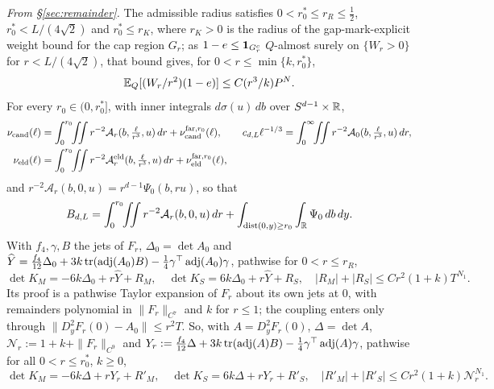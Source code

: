 \emph{From \S\ref{sec:remainder}.} The admissible radius satisfies $0<r_0^*\le r_R\le\frac12$, $r_0^*<L/(4\sqrt2)$ and $r_0^*\le r_K$, where $r_K>0$ is the radius of the gap-mark-explicit weight bound for the cap region $G_r$; as $1-e\le\mathbf 1_{G_r^c}$ $Q$-almost surely on $\{W_r>0\}$ for $r<L/(4\sqrt2)$, that bound gives, for $0<r\le\min\{k,r_0^*\}$,
\begin{equation}\label{eq:third-K2}
\mathbb E_Q[(W_r/r^2)(1-e)]\le C(r^3/k)P^N.
\end{equation}
For every $r_0\in(0,r_0^*]$, with inner integrals $d\sigma(u)\,db$ over $S^{d-1}\times\mathbb R$,
\begin{equation}\label{eq:third-ident}
\begin{aligned}
\nu_{\mathrm{cand}}(\ell)&=\int_0^{r_0}\!\!\iint r^{-2}\mathcal A_r(b,\tfrac\ell{r^3},u)\,dr+\nu_{\mathrm{cand}}^{{\rm far},r_0}(\ell),\qquad
c_{d,L}\ell^{-1/3}=\int_0^\infty\!\!\iint r^{-2}\mathcal A_0(b,\tfrac\ell{r^3},u)\,dr,\\
\nu_{\mathrm{eld}}(\ell)&=\int_0^{r_0}\!\!\iint r^{-2}\mathcal A^{\mathrm{eld}}_r(b,\tfrac\ell{r^3},u)\,dr+\nu_{\mathrm{eld}}^{{\rm far},r_0}(\ell),
\end{aligned}
\end{equation}
and $r^{-2}\mathcal A_r(b,0,u)=r^{d-1}\Psi_0(b,ru)$, so that
\begin{equation}\label{eq:third-Bsplit}
B_{d,L}=\int_0^{r_0}\!\!\iint r^{-2}\mathcal A_r(b,0,u)\,dr+\int_{\operatorname{dist}(0,y)\ge r_0}\int_\mathbb R\Psi_0\,db\,dy.
\end{equation}
With $f_4,\gamma,B$ the jets of $F_r$, $\Delta_0=\det A_0$ and $\widehat Y=\frac{f_4}{12}\Delta_0+3k\operatorname{tr}(\operatorname{adj}(A_0)B)-\frac14\gamma^\top\operatorname{adj}(A_0)\gamma$, pathwise for $0<r\le r_R$,
\begin{equation}\label{eq:third-exp}
\det K_M=-6k\Delta_0+r\widehat Y+R_M,\quad \det K_S=6k\Delta_0+r\widehat Y+R_S,\quad |R_M|+|R_S|\le Cr^2(1+k)T^{N_1}.
\end{equation}
Its proof is a pathwise Taylor expansion of $F_r$ about its own jets at $0$, with remainders polynomial in $\|F_r\|_{C^7}$ and $k$ for $r\le1$; the coupling enters only through $\|D_y^2F_r(0)-A_0\|\le r^2T$. So, with $A=D_y^2F_r(0)$, $\Delta=\det A$, $\mathcal N_r:=1+k+\|F_r\|_{C^9}$ and $Y_r:=\frac{f_4}{12}\Delta+3k\operatorname{tr}(\operatorname{adj}(A)B)-\frac14\gamma^\top\operatorname{adj}(A)\gamma$, pathwise for all $0<r\le r_0^*$, $k\ge0$,
\begin{equation}\label{eq:third-ownexp}
\det K_M=-6k\Delta+rY_r+R'_M,\quad \det K_S=6k\Delta+rY_r+R'_S,\quad |R'_M|+|R'_S|\le Cr^2(1+k)\mathcal N_r^{N_1}.
\end{equation}
